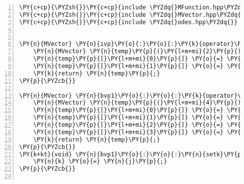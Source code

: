 \begin{Verbatim}[tabsize=2,commandchars=\\\{\},numbers=left,firstnumber=1,stepnumber=1]
\PY{c+cp}{\PYZsh{}}\PY{c+cp}{include \PYZdq{}MFunction.hpp\PYZdq{}}
\PY{c+cp}{\PYZsh{}}\PY{c+cp}{include \PYZdq{}MVector.hpp\PYZdq{}}
\PY{c+cp}{\PYZsh{}}\PY{c+cp}{include \PYZdq{}odes.hpp\PYZdq{}}


\PY{n}{MVector} \PY{n}{ivp}\PY{o}{:}\PY{o}{:}\PY{k}{operator}\PY{p}{(}\PY{p}{)}\PY{p}{(}\PY{k}{const} \PY{k+kt}{double}\PY{o}{\PYZam{}} \PY{n}{x}\PY{p}{,} \PY{k}{const} \PY{n}{MVector}\PY{o}{\PYZam{}} \PY{n}{y}\PY{p}{)}\PY{p}{\PYZob{}}
	\PY{n}{MVector} \PY{n}{temp}\PY{p}{(}\PY{l+m+mi}{2}\PY{p}{)}\PY{p}{;}
 	\PY{n}{temp}\PY{p}{[}\PY{l+m+mi}{0}\PY{p}{]} \PY{o}{=} \PY{n}{y}\PY{p}{[}\PY{l+m+mi}{1}\PY{p}{]}\PY{p}{;}
 	\PY{n}{temp}\PY{p}{[}\PY{l+m+mi}{1}\PY{p}{]} \PY{o}{=} \PY{l+m+mi}{4} \PY{o}{+} \PY{p}{(}\PY{l+m+mf}{1.}\PY{o}{/}\PY{l+m+mf}{4.}\PY{p}{)}\PY{o}{*}\PY{n}{x}\PY{o}{*}\PY{n}{x}\PY{o}{*}\PY{n}{x} \PY{o}{\PYZhy{}} \PY{p}{(}\PY{l+m+mf}{1.}\PY{o}{/}\PY{l+m+mf}{8.}\PY{p}{)}\PY{o}{*}\PY{n}{y}\PY{p}{[}\PY{l+m+mi}{0}\PY{p}{]}\PY{o}{*}\PY{n}{y}\PY{p}{[}\PY{l+m+mi}{1}\PY{p}{]}\PY{p}{;}
	\PY{k}{return} \PY{n}{temp}\PY{p}{;}
\PY{p}{\PYZcb{}}

\PY{n}{MVector} \PY{n}{bvp1}\PY{o}{:}\PY{o}{:}\PY{k}{operator}\PY{p}{(}\PY{p}{)}\PY{p}{(}\PY{k}{const} \PY{k+kt}{double}\PY{o}{\PYZam{}} \PY{n}{x}\PY{p}{,} \PY{k}{const} \PY{n}{MVector}\PY{o}{\PYZam{}} \PY{n}{y}\PY{p}{)}\PY{p}{\PYZob{}}
	\PY{n}{MVector} \PY{n}{temp}\PY{p}{(}\PY{l+m+mi}{4}\PY{p}{)}\PY{p}{;}
	\PY{n}{temp}\PY{p}{[}\PY{l+m+mi}{0}\PY{p}{]} \PY{o}{=} \PY{n}{y}\PY{p}{[}\PY{l+m+mi}{1}\PY{p}{]}\PY{p}{;}
	\PY{n}{temp}\PY{p}{[}\PY{l+m+mi}{1}\PY{p}{]} \PY{o}{=} \PY{o}{\PYZhy{}}\PY{n}{k}\PY{o}{*}\PY{n}{y}\PY{p}{[}\PY{l+m+mi}{1}\PY{p}{]} \PY{o}{\PYZhy{}} \PY{n}{x}\PY{o}{*}\PY{n}{y}\PY{p}{[}\PY{l+m+mi}{0}\PY{p}{]}\PY{p}{;}
	\PY{n}{temp}\PY{p}{[}\PY{l+m+mi}{2}\PY{p}{]} \PY{o}{=} \PY{n}{y}\PY{p}{[}\PY{l+m+mi}{3}\PY{p}{]}\PY{p}{;}
	\PY{n}{temp}\PY{p}{[}\PY{l+m+mi}{3}\PY{p}{]} \PY{o}{=} \PY{o}{\PYZhy{}}\PY{n}{k}\PY{o}{*}\PY{n}{y}\PY{p}{[}\PY{l+m+mi}{3}\PY{p}{]} \PY{o}{\PYZhy{}} \PY{n}{x}\PY{o}{*}\PY{n}{y}\PY{p}{[}\PY{l+m+mi}{2}\PY{p}{]}\PY{p}{;}
	\PY{k}{return} \PY{n}{temp}\PY{p}{;}
\PY{p}{\PYZcb{}}
\PY{k+kt}{void} \PY{n}{bvp1}\PY{o}{:}\PY{o}{:}\PY{n}{setk}\PY{p}{(}\PY{k+kt}{double} \PY{n}{j}\PY{p}{)}\PY{p}{\PYZob{}}
	\PY{n}{k} \PY{o}{=} \PY{n}{j}\PY{p}{;}
\PY{p}{\PYZcb{}}


\end{Verbatim}
